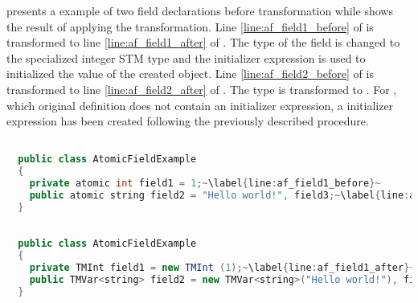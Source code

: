  presents a example of two  field declarations before transformation while  shows the result of applying the transformation. Line \ref{line:af_field1_before} of  is transformed to line \ref{line:af_field1_after} of . The type of the field is changed to the specialized integer \ac{STM} type  and the initializer expression is used to initialized the value of the created  object. Line \ref{line:af_field2_before} of  is transformed to line \ref{line:af_field2_after} of . The type is transformed to . For , which original definition does not contain an initializer expression, a initializer expression has been created following the previously described procedure.
 
\begin{lstlisting}[label=lst:before_atomic_field,
  caption={\bscode{atomic} Field Before Transformation},
  language=Java,  
  showspaces=false,
  showtabs=false,
  breaklines=true,
  showstringspaces=false,
  breakatwhitespace=true,
  escapechar=~,
  commentstyle=\color{greencomments},
  keywordstyle=\color{bluekeywords},
  stringstyle=\color{redstrings},
  morekeywords={atomic, retry, orelse, var, get, set}]  % Start your code-block

  public class AtomicFieldExample
  {
    private atomic int field1 = 1;~\label{line:af_field1_before}~
    public atomic string field2 = "Hello world!", field3;~\label{line:af_field2_before}~
  }
\end{lstlisting}

\begin{lstlisting}[label=lst:after_atomic_field,
  caption={\bscode{atomic} Field After Transformation},
  language=Java,  
  showspaces=false,
  showtabs=false,
  breaklines=true,
  showstringspaces=false,
  breakatwhitespace=true,
  escapechar=~,
  commentstyle=\color{greencomments},
  keywordstyle=\color{bluekeywords},
  stringstyle=\color{redstrings},
  morekeywords={atomic, retry, orelse, var, get, set, string}]  % Start your code-block

  public class AtomicFieldExample
  {
    private TMInt field1 = new TMInt (1);~\label{line:af_field1_after}~
    public TMVar<string> field2 = new TMVar<string>("Hello world!"), field3 = new TMVar<string>();~\label{line:af_field2_after}~
  }
\end{lstlisting}
 

